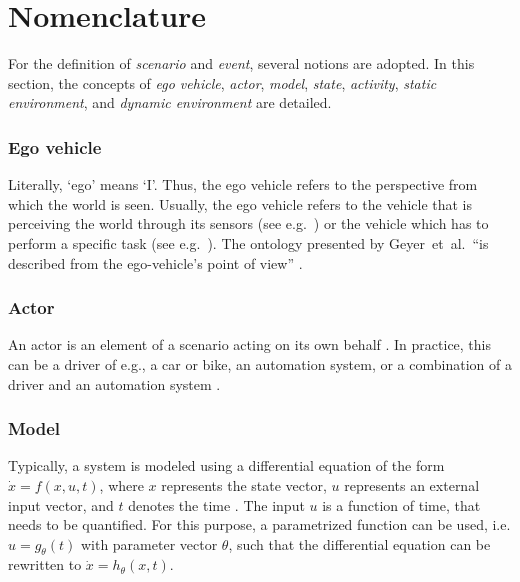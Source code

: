 \section{Nomenclature}
\label{sec:nomenclature}

For the definition of \emph{scenario} and \emph{event}, several notions are adopted. In this section, the concepts of \emph{ego vehicle}, \emph{actor}, \emph{model}, \emph{state}, \emph{activity}, \emph{static environment}, and \emph{dynamic environment} are detailed. 

\subsubsection{Ego vehicle}
\label{sec:ego vehicle}
Literally, `ego' means `I'. Thus, the ego vehicle refers to the perspective from which the world is seen. Usually, the ego vehicle refers to the vehicle that is perceiving the world through its sensors (see e.g.~\cite{Bonnin2014}) or the vehicle which has to perform a specific task (see e.g.~\cite{althoff2017CommonRoad}). The ontology presented by Geyer~et~al.\ ``is described from the ego-vehicle's point of view'' \cite{geyer2014}.  

\subsubsection{Actor}
\label{sec:actor}
An actor is an element of a scenario acting on its own behalf \cite{ulbrich2015}. In practice, this can be a driver of e.g., a car or bike, an automation system, or a combination of a driver and an automation system \cite{geyer2014}.

\subsubsection{Model}
\label{sec:model}
Typically, a system is modeled using a differential equation of the form $\dot{x}=f(x,u,t)$, where $x$ represents the state vector, $u$ represents an external input vector, and $t$ denotes the time \cite{norman2011control}. The input $u$ is a function of time, that needs to be quantified. For this purpose, a parametrized function can be used, i.e. $u=g_{\theta}(t)$ with parameter vector $\theta$, such that the differential equation can be rewritten to $\dot{x}=h_{\theta}(x,t)$.

